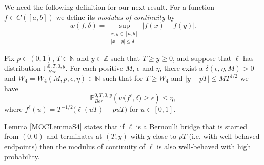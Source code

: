 We need the following definition for our next result. For a function $f \in C([a,b])$ we define its {\em modulus of continuity} by
\begin{equation}\label{MOCS4}
w(f,\delta) = \sup_{\substack{x,y \in [a,b]\\ |x-y| \leq \delta}} |f(x) - f(y)|.
\end{equation}
\begin{lemma}\label{MOCLemmaS4}Fix $p \in (0,1)$, $T \in \mathbb{N}$ and $y\in \mathbb{Z}$ such that $T \geq y \geq 0$, and suppose that $\ell$ has distribution $\mathbb{P}^{0,T,0,y}_{Ber}$. For each positive $M$, $\epsilon$ and $\eta$, there exist a $\delta(\epsilon, \eta, M) > 0$ and $W_4 = W_4(M, p, \epsilon, \eta) \in \mathbb{N}$ such that  for $T \geq W_4$ and $|y - pT| \leq MT^{1/2}$ we have
\begin{equation}\label{MOCeqS4}
\mathbb{P}^{0,T,0,y}_{Ber}\left( w\big({f^\ell},\delta\big) \geq \epsilon \right) \leq \eta,
\end{equation}
where $f^\ell(u) = T^{-1/2}\big(\ell(uT) - puT\big)$  for $u \in [0,1]$.
\end{lemma}
\begin{remark}
Lemma \ref{MOCLemmaS4} states that if $\ell$ is a Bernoulli bridge that is started from $(0,0)$ and terminates at $(T,y)$ with $y$ close to $pT$ (i.e. with well-behaved endpoints) then the modulus of continuity of $\ell$ is also well-behaved with high probability.
\end{remark}
